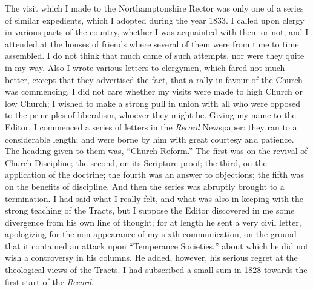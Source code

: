 The visit which I made to the Northamptonshire Rector was only one of
a series of similar expedients, which I adopted during the year 1833. I
called upon clergy in various parts of the country, whether I was
acquainted with them or not, and I attended at the houses of friends
where several of them were from time to time assembled. I do not think
that much came of such attempts, nor were they quite in my way. Also I
wrote various letters to clergymen, which fared not much better, except
that they advertised the fact, that a rally in favour of the Church was
commencing. I did not care whether my visits were made to high Church or
low Church; I wished to make a strong pull in union with all who were
opposed to the principles of liberalism, whoever they might be. Giving
my name to the Editor, I commenced a series of letters in the \emph{Record}
Newspaper: they ran to a considerable length; and were borne by him with
great courtesy and patience. The heading
given to them was, ``Church Reform.'' The first was on the
revival of Church
Discipline; the second, on its Scripture proof; the third, on the
application of the doctrine; the fourth was an answer to objections;
the fifth was on the benefits of discipline. And then the series
was abruptly brought to a termination. I had said what I really felt,
and what was also in keeping with the strong teaching of the Tracts, but
I suppose the Editor discovered in me some divergence from his own line
of thought; for at length he sent a very civil letter, apologizing for
the non-appearance of my sixth communication, on the ground that it
contained an attack upon ``Temperance Societies,'' about which
he did not wish a controversy in his columns. He added, however, his
serious regret at the theological views of the Tracts. I had subscribed a small
sum in 1828 towards the first start of the \emph{Record}.

